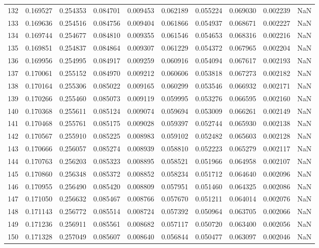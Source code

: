 \begin{tabular}{lrrrrrrrrr}
132 & 0.169527 & 0.254353 & 0.084701 & 0.009453 & 0.062189 & 0.055224 & 0.069030 & 0.002239 & NaN \\
133 & 0.169636 & 0.254516 & 0.084756 & 0.009404 & 0.061866 & 0.054937 & 0.068671 & 0.002227 & NaN \\
134 & 0.169744 & 0.254677 & 0.084810 & 0.009355 & 0.061546 & 0.054653 & 0.068316 & 0.002216 & NaN \\
135 & 0.169851 & 0.254837 & 0.084864 & 0.009307 & 0.061229 & 0.054372 & 0.067965 & 0.002204 & NaN \\
136 & 0.169956 & 0.254995 & 0.084917 & 0.009259 & 0.060916 & 0.054094 & 0.067617 & 0.002193 & NaN \\
137 & 0.170061 & 0.255152 & 0.084970 & 0.009212 & 0.060606 & 0.053818 & 0.067273 & 0.002182 & NaN \\
138 & 0.170164 & 0.255306 & 0.085022 & 0.009165 & 0.060299 & 0.053546 & 0.066932 & 0.002171 & NaN \\
139 & 0.170266 & 0.255460 & 0.085073 & 0.009119 & 0.059995 & 0.053276 & 0.066595 & 0.002160 & NaN \\
140 & 0.170368 & 0.255611 & 0.085124 & 0.009074 & 0.059694 & 0.053009 & 0.066261 & 0.002149 & NaN \\
141 & 0.170468 & 0.255761 & 0.085175 & 0.009028 & 0.059397 & 0.052744 & 0.065930 & 0.002138 & NaN \\
142 & 0.170567 & 0.255910 & 0.085225 & 0.008983 & 0.059102 & 0.052482 & 0.065603 & 0.002128 & NaN \\
143 & 0.170666 & 0.256057 & 0.085274 & 0.008939 & 0.058810 & 0.052223 & 0.065279 & 0.002117 & NaN \\
144 & 0.170763 & 0.256203 & 0.085323 & 0.008895 & 0.058521 & 0.051966 & 0.064958 & 0.002107 & NaN \\
145 & 0.170860 & 0.256348 & 0.085372 & 0.008852 & 0.058234 & 0.051712 & 0.064640 & 0.002096 & NaN \\
146 & 0.170955 & 0.256490 & 0.085420 & 0.008809 & 0.057951 & 0.051460 & 0.064325 & 0.002086 & NaN \\
147 & 0.171050 & 0.256632 & 0.085467 & 0.008766 & 0.057670 & 0.051211 & 0.064014 & 0.002076 & NaN \\
148 & 0.171143 & 0.256772 & 0.085514 & 0.008724 & 0.057392 & 0.050964 & 0.063705 & 0.002066 & NaN \\
149 & 0.171236 & 0.256911 & 0.085561 & 0.008682 & 0.057117 & 0.050720 & 0.063400 & 0.002056 & NaN \\
150 & 0.171328 & 0.257049 & 0.085607 & 0.008640 & 0.056844 & 0.050477 & 0.063097 & 0.002046 & NaN \\

\end{tabular}
